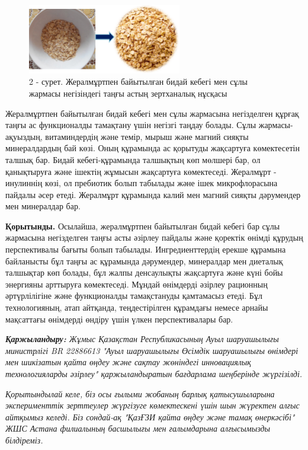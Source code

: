 \begin{figure}[H]
	\centering
	\includegraphics[width=0.6\textwidth]{media/pish2/image3}
	\caption*{2 - сурет. Жералмұртпен байытылған бидай кебегі мен сұлы жармасы негізіндегі таңғы астың зертханалық нұсқасы}
\end{figure}

\begin{multicols}{2}
Жералмұртпен байытылған бидай кебегі мен сұлы жармасына негізделген
құрғақ таңғы ас функционалды тамақтану үшін негізгі таңдау болады. Сұлы
жармасы-ақуыздың, витаминдердің және темір, мырыш және магний сияқты
минералдардың бай көзі. Оның құрамында ас қорытуды жақсартуға
көмектесетін талшық бар. Бидай кебегі-құрамында талшықтың көп мөлшері
бар, ол қанықтыруға және ішектің жұмысын жақсартуға көмектеседі.
Жералмұрт - инулиннің көзі, ол пребиотик болып табылады және ішек
микрофлорасына пайдалы әсер етеді. Жералмұрт құрамында калий мен магний
сияқты дәрумендер мен минералдар бар.

{\bfseries Қорытынды.} Осылайша, жералмұртпен байытылған бидай кебегі бар
сұлы жармасына негізделген таңғы асты әзірлеу пайдалы және қоректік
өнімді құрудың перспективалы бағыты болып табылады. Ингредиенттердің
ерекше құрамына байланысты бұл таңғы ас құрамында дәрумендер, минералдар
мен диеталық талшықтар көп болады, бұл жалпы денсаулықты жақсартуға және
күні бойы энергияны арттыруға көмектеседі. Мұндай өнімдерді әзірлеу
рационның әртүрлілігіне және функционалды тамақстануды қамтамасыз етеді.
Бұл технологияның, атап айтқанда, теңдестірілген құрамдағы немесе арнайы
мақсаттағы өнімдерді өндіру үшін үлкен перспективалары бар.

\emph{{\bfseries Қаржыландыру:} Жұмыс Қазақстан Республикасының Ауыл
шаруашылығы министрлігі BR 22886613 "Ауыл шаруашылығы Өсімдік
шаруашылығы өнімдері мен шикізатын қайта өңдеу және сақтау жөніндегі
инновациялық технологияларды әзірлеу" қаржыландыратын бағдарлама
шеңберінде жүргізілді.}

\emph{Қорытындылай келе, біз осы ғылыми жобаның барлық қатысушыларына
эксперименттік зерттеулер жүргізуге көмектескені үшін шын жүректен алғыс
айтқымыз келеді. Біз сондай-ақ "ҚазҒЗИ қайта өңдеу және тамақ
өнеркәсібі" ЖШС Астана филиалының басшылығы мен ғалымдарына алғысымызды
білдіреміз.}
\end{multicols}

